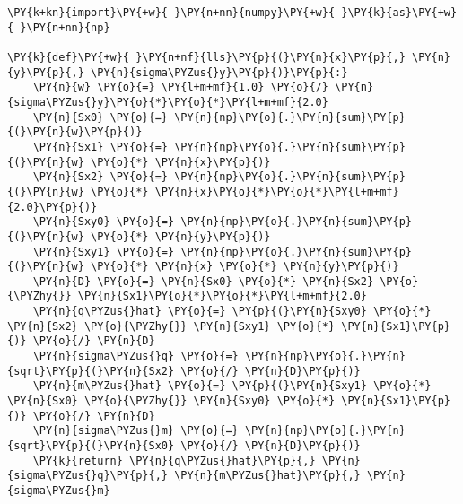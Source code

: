 \begin{Verbatim}[label=\makebox{\href{https://github.com/unipi-physics-labs/lab1-notes/tree/main/snippy/linear_least_squares.py}{https://github.com/.../linear\_least\_squares.py}},commandchars=\\\{\}]
\PY{k+kn}{import}\PY{+w}{ }\PY{n+nn}{numpy}\PY{+w}{ }\PY{k}{as}\PY{+w}{ }\PY{n+nn}{np}

\PY{k}{def}\PY{+w}{ }\PY{n+nf}{lls}\PY{p}{(}\PY{n}{x}\PY{p}{,} \PY{n}{y}\PY{p}{,} \PY{n}{sigma\PYZus{}y}\PY{p}{)}\PY{p}{:}
    \PY{n}{w} \PY{o}{=} \PY{l+m+mf}{1.0} \PY{o}{/} \PY{n}{sigma\PYZus{}y}\PY{o}{*}\PY{o}{*}\PY{l+m+mf}{2.0}
    \PY{n}{Sx0} \PY{o}{=} \PY{n}{np}\PY{o}{.}\PY{n}{sum}\PY{p}{(}\PY{n}{w}\PY{p}{)}
    \PY{n}{Sx1} \PY{o}{=} \PY{n}{np}\PY{o}{.}\PY{n}{sum}\PY{p}{(}\PY{n}{w} \PY{o}{*} \PY{n}{x}\PY{p}{)}
    \PY{n}{Sx2} \PY{o}{=} \PY{n}{np}\PY{o}{.}\PY{n}{sum}\PY{p}{(}\PY{n}{w} \PY{o}{*} \PY{n}{x}\PY{o}{*}\PY{o}{*}\PY{l+m+mf}{2.0}\PY{p}{)}
    \PY{n}{Sxy0} \PY{o}{=} \PY{n}{np}\PY{o}{.}\PY{n}{sum}\PY{p}{(}\PY{n}{w} \PY{o}{*} \PY{n}{y}\PY{p}{)}
    \PY{n}{Sxy1} \PY{o}{=} \PY{n}{np}\PY{o}{.}\PY{n}{sum}\PY{p}{(}\PY{n}{w} \PY{o}{*} \PY{n}{x} \PY{o}{*} \PY{n}{y}\PY{p}{)}
    \PY{n}{D} \PY{o}{=} \PY{n}{Sx0} \PY{o}{*} \PY{n}{Sx2} \PY{o}{\PYZhy{}} \PY{n}{Sx1}\PY{o}{*}\PY{o}{*}\PY{l+m+mf}{2.0}
    \PY{n}{q\PYZus{}hat} \PY{o}{=} \PY{p}{(}\PY{n}{Sxy0} \PY{o}{*} \PY{n}{Sx2} \PY{o}{\PYZhy{}} \PY{n}{Sxy1} \PY{o}{*} \PY{n}{Sx1}\PY{p}{)} \PY{o}{/} \PY{n}{D}
    \PY{n}{sigma\PYZus{}q} \PY{o}{=} \PY{n}{np}\PY{o}{.}\PY{n}{sqrt}\PY{p}{(}\PY{n}{Sx2} \PY{o}{/} \PY{n}{D}\PY{p}{)}
    \PY{n}{m\PYZus{}hat} \PY{o}{=} \PY{p}{(}\PY{n}{Sxy1} \PY{o}{*} \PY{n}{Sx0} \PY{o}{\PYZhy{}} \PY{n}{Sxy0} \PY{o}{*} \PY{n}{Sx1}\PY{p}{)} \PY{o}{/} \PY{n}{D}
    \PY{n}{sigma\PYZus{}m} \PY{o}{=} \PY{n}{np}\PY{o}{.}\PY{n}{sqrt}\PY{p}{(}\PY{n}{Sx0} \PY{o}{/} \PY{n}{D}\PY{p}{)}
    \PY{k}{return} \PY{n}{q\PYZus{}hat}\PY{p}{,} \PY{n}{sigma\PYZus{}q}\PY{p}{,} \PY{n}{m\PYZus{}hat}\PY{p}{,} \PY{n}{sigma\PYZus{}m}


\end{Verbatim}
